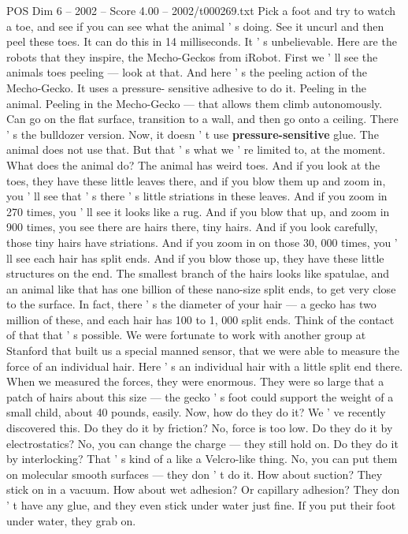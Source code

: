 \begin{textsample}{POS Dim 6 – 2002 – Score 4.00 – 2002/t000269.txt}
Pick a foot and try to watch a toe, and see if you can see what the animal ' s doing.
See it uncurl and then peel these toes.
It can do this in 14 milliseconds.
It ' s unbelievable.
Here are the robots that they inspire, the Mecho-Geckos from iRobot.
First we ' ll see the animals toes peeling — look at that.
And here ' s the peeling action of the Mecho-Gecko.
It uses a pressure- sensitive adhesive to do it.
Peeling in the animal.
Peeling in the Mecho-Gecko — that allows them climb autonomously.
Can go on the flat surface, transition to a wall, and then go onto a ceiling.
There ' s the bulldozer version.
Now, it doesn ' t use \textbf{pressure-sensitive} glue.
The animal does not use that.
But that ' s what we ' re limited to, at the moment.
What does the animal do?
The animal has weird toes.
And if you look at the toes, they have these little leaves there, and if you blow them up and zoom in, you ' ll see that ' s there ' s little striations in these leaves.
And if you zoom in 270 times, you ' ll see it looks like a rug.
And if you blow that up, and zoom in 900 times, you see there are hairs there, tiny hairs.
And if you look carefully, those tiny hairs have striations.
And if you zoom in on those 30, 000 times, you ' ll see each hair has split ends.
And if you blow those up, they have these little structures on the end.
The smallest branch of the hairs looks like spatulae, and an animal like that has one billion of these nano-size split ends, to get very close to the surface.
In fact, there ' s the diameter of your hair — a gecko has two million of these, and each hair has 100 to 1, 000 split ends.
Think of the contact of that that ' s possible.
We were fortunate to work with another group at Stanford that built us a special manned sensor, that we were able to measure the force of an individual hair.
Here ' s an individual hair with a little split end there.
When we measured the forces, they were enormous.
They were so large that a patch of hairs about this size — the gecko ' s foot could support the weight of a small child, about 40 pounds, easily.
Now, how do they do it?
We ' ve recently discovered this.
Do they do it by friction?
No, force is too low.
Do they do it by electrostatics?
No, you can change the charge — they still hold on.
Do they do it by interlocking?
That ' s kind of a like a Velcro-like thing.
No, you can put them on molecular smooth surfaces — they don ' t do it.
How about suction?
They stick on in a vacuum.
How about wet adhesion?
Or capillary adhesion?
They don ' t have any glue, and they even stick under water just fine.
If you put their foot under water, they grab on.

\end{textsample}
